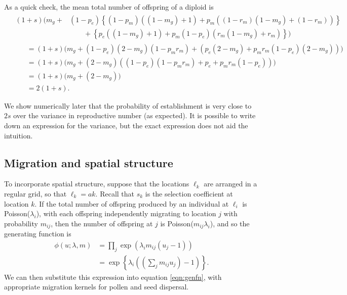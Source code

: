 As a quick check,
the mean total number of offspring of a diploid is
\begin{align}
  & \begin{aligned}
(1+s) \big(
    m_g
    + & (1-p_e)\left\{ (1-p_m) ( (1-m_g) + 1 ) + p_m ( (1-r_m)(1-m_g) + (1-r_m) ) \right\} \\
    & \qquad + \left\{ p_e ( (1-m_g) + 1 ) + p_m (1-p_e)( r_m(1-m_g) + r_m ) \right\} 
    \big) 
  \end{aligned}  \\
& \qquad = 
    (1+s) \big( m_g + 
      (1-p_e)(2-m_g)(1 - p_m r_m)
      + ( p_e (2-m_g) + p_m r_m (1-p_e)(2-m_g) )
    \big) \\
& \qquad = (1+s) \big( 
    m_g + (2-m_g) ( (1-p_e) (1 - p_m r_m) + p_e + p_m r_m(1-p_e) )
  \big) \\
& \qquad = (1+s) \big( 
    m_g + (2-m_g)
  \big) \\
& \qquad = 2(1+s) .
\end{align}

We show numerically later that the probability of establishment is very close to $2s$ over the variance in reproductive number (as expected).
It is possible to write down an expression for the variance, 
but the exact expression does not aid the intuition.

\subsection*{Migration and spatial structure}

To incorporate spatial structure, suppose that the locations $\ell_k$ are arranged in a regular grid, so that $\ell_k = a k$. 
Recall that $s_k$ is the selection coefficient at location $k$.
If the total number of offspring produced by an individual at $\ell_i$ is Poisson($\lambda_i$), with each offspring independently migrating to location $j$
with probability $m_{ij}$,
then the number of offspring at $j$ is Poisson($m_{ij}\lambda_i$),
and so the generating function is
\begin{align}
  \phi(u;\lambda,m) &= \prod_j \exp( \lambda_i m_{ij} ( u_j - 1 ) ) \\
  &= \exp\left\{ \lambda_i \left(\left(\sum_j m_{ij} u_j\right) - 1\right) \right\} .
\end{align}
We can then substitute this expression into equation \eqref{eqn:genfn},
with appropriate migration kernels for pollen and seed dispersal.

